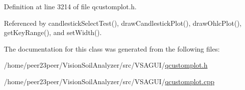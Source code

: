 Definition at line 3214 of file qcustomplot.\+h.



Referenced by candlestick\+Select\+Test(), draw\+Candlestick\+Plot(), draw\+Ohlc\+Plot(), get\+Key\+Range(), and set\+Width().



The documentation for this class was generated from the following files\+:\begin{DoxyCompactItemize}
\item 
/home/peer23peer/\+Vision\+Soil\+Analyzer/src/\+V\+S\+A\+G\+U\+I/\hyperlink{qcustomplot_8h}{qcustomplot.\+h}\item 
/home/peer23peer/\+Vision\+Soil\+Analyzer/src/\+V\+S\+A\+G\+U\+I/\hyperlink{qcustomplot_8cpp}{qcustomplot.\+cpp}\end{DoxyCompactItemize}
